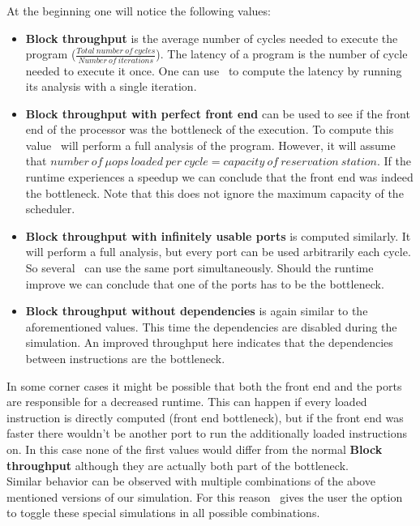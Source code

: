 At the beginning one will notice the following values:
\begin{itemize}
    \item \textbf{Block throughput} is the average number of cycles needed to execute the program ($\frac{Total\ number\ of\ cycles}{Number\ of\ iterations}$).
    The latency of a program is the number of cycle needed to execute it once. One can use \suaca\ to compute the latency by running its analysis with a single iteration.
    \item \textbf{Block throughput with perfect front end} can be used to see if the front end of the processor was the bottleneck of the execution. To compute this value \suaca\ will perform a full analysis of the program. However, it will assume that $number\ of\ \mu ops\ loaded\ per\ cycle = capacity\ of\ reservation\ station$. If the runtime experiences a speedup we can conclude that the front end was indeed the bottleneck. Note that this does not ignore the maximum capacity of the scheduler.
    \item \textbf{Block throughput with infinitely usable ports} is computed similarly. It will perform a full analysis, but every port can be used arbitrarily each cycle. So several \microops\ can use the same port simultaneously. Should the runtime improve we can conclude that one of the ports has to be the bottleneck.
    \item \textbf{Block throughput without dependencies} is again similar to the aforementioned values. This time the dependencies are disabled during the simulation. An improved throughput here indicates that the dependencies between instructions are the bottleneck. 
\end{itemize}

In some corner cases it might be possible that both the front end and the ports are responsible for a decreased runtime. This can happen if every loaded instruction is directly computed (front end bottleneck), but if the front end was faster there wouldn't be another port to run the additionally loaded instructions on. In this case none of the first values would differ from the normal \textbf{Block throughput} although they are actually both part of the bottleneck.\\
Similar behavior can be observed with multiple combinations of the above mentioned versions of our simulation. For this reason \suaca\ gives the user the option to toggle these special simulations in all possible combinations.\\


